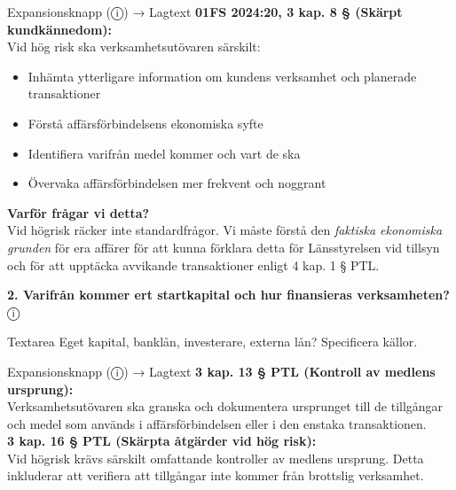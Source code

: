 \documentclass[10pt]{beamer}
\begin{document}
\begin{frame}[label=riskfragor-steg4]
\begin{alertblock}{Expansionsknapp (ⓘ) → Lagtext}
    \tiny \textbf{01FS 2024:20, 3 kap. 8 § (Skärpt kundkännedom):}\\
    \tiny Vid hög risk ska verksamhetsutövaren särskilt:
    \begin{itemize}
      \item Inhämta ytterligare information om kundens verksamhet och planerade transaktioner
      \item Förstå affärsförbindelsens ekonomiska syfte
      \item Identifiera varifrån medel kommer och vart de ska
      \item Övervaka affärsförbindelsen mer frekvent och noggrant
    \end{itemize}
    \vspace{0.1cm}
    
    \tiny \textbf{Varför frågar vi detta?}\\
    \tiny Vid högrisk räcker inte standardfrågor. Vi måste förstå den \emph{faktiska ekonomiska grunden} för era affärer
    för att kunna förklara detta för Länsstyrelsen vid tillsyn och för att upptäcka avvikande transaktioner enligt 4 kap. 1 § PTL.
  \end{alertblock}

  \vspace{0.4cm}

  \textbf{2. Varifrån kommer ert startkapital och hur finansieras verksamheten?} \hspace{0.3cm} ⓘ\\
  \begin{block}{Textarea}
    \tiny Eget kapital, banklån, investerare, externa lån? Specificera källor.
  \end{block}
  \begin{alertblock}{Expansionsknapp (ⓘ) → Lagtext}
    \tiny \textbf{3 kap. 13 § PTL (Kontroll av medlens ursprung):}\\
    \tiny Verksamhetsutövaren ska granska och dokumentera ursprunget till de tillgångar och medel som
    används i affärsförbindelsen eller i den enstaka transaktionen.\\[0.1cm]
    
    \tiny \textbf{3 kap. 16 § PTL (Skärpta åtgärder vid hög risk):}\\
    \tiny Vid högrisk krävs särskilt omfattande kontroller av medlens ursprung. Detta inkluderar att verifiera
    att tillgångar inte kommer från brottslig verksamhet.\\[0.1cm]
    

\end{alertblock}
\end{frame}
\end{document}
